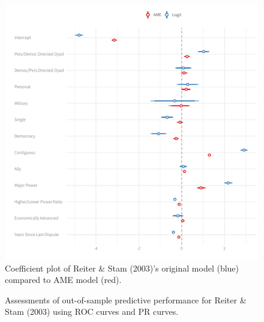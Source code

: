\documentclass[12pt]{amsart}
\begin{document}
\begin{figure}
\includegraphics[width=\textwidth]{reiter_coefs_all.pdf}
\caption{\label{fig:reitCoef} Coefficient plot of Reiter \& Stam (2003)'s original model (blue) compared to AME model (red). }
\end{figure}

\begin{figure}
\centering   
{}
\caption{Assessments of out-of-sample predictive performance for Reiter \& Stam (2003) using ROC curves and PR curves.}
\end{figure}
\end{document}
